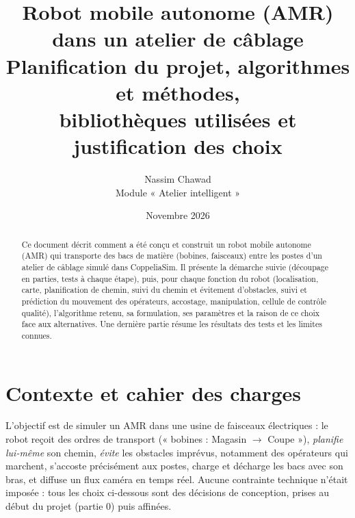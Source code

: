\documentclass[11pt,a4paper]{article}
\title{\textbf{Robot mobile autonome (AMR) dans un atelier de câblage}\\[4pt]
\large Planification du projet, algorithmes et méthodes,\\ bibliothèques utilisées et justification des choix}
\author{Nassim Chawad\\ Module « Atelier intelligent »}
\date{Novembre 2026}
\begin{document}
\maketitle

\begin{abstract}
Ce document décrit comment a été conçu et construit un robot mobile autonome (AMR) qui transporte
des bacs de matière (bobines, faisceaux) entre les postes d'un atelier de câblage simulé dans
CoppeliaSim. Il présente la démarche suivie (découpage en parties, tests à chaque étape), puis,
pour chaque fonction du robot (localisation, carte, planification de chemin, suivi du chemin et
évitement d'obstacles, suivi et prédiction du mouvement des opérateurs, accostage, manipulation,
cellule de contrôle qualité), l'algorithme retenu, sa
formulation, ses paramètres et la raison de ce choix face aux alternatives. Une dernière partie
résume les résultats des tests et les limites connues.
\end{abstract}

\tableofcontents
\newpage

\section{Contexte et cahier des charges}

L'objectif est de simuler un AMR dans une usine de faisceaux électriques : le robot reçoit des
ordres de transport (« bobines : Magasin $\rightarrow$ Coupe »), \emph{planifie lui-même} son
chemin, \emph{évite} les obstacles imprévus, notamment des opérateurs qui marchent, s'accoste
précisément aux postes, charge et décharge les bacs avec son bras, et diffuse un flux caméra en
temps réel. Aucune contrainte technique n'était imposée : tous les choix ci-dessous sont des
décisions de conception, prises au début du projet (partie 0) puis affinées.
\end{document}
